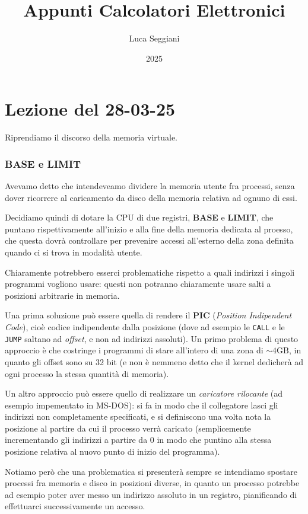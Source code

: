 \documentclass[a4paper,11pt]{article}
\title{Appunti Calcolatori Elettronici}
\author{Luca Seggiani}
\date{2025}
\begin{document}
\section{Lezione del 28-03-25}

\thispagestyle{empty}
\pagestyle{fancy}

Riprendiamo il discorso della memoria virtuale.

\subsubsection{BASE e LIMIT}
Avevamo detto che intendeveamo dividere la memoria utente fra processi, senza dover ricorrere al caricamento da disco della memoria relativa ad ognuno di essi.

Decidiamo quindi di dotare la CPU di due registri, \textbf{BASE} e \textbf{LIMIT}, che puntano rispettivamente all'inizio e alla fine della memoria dedicata al proesso, che questa dovrà controllare per prevenire accessi all'esterno della zona definita quando ci si trova in modalità utente.

Chiaramente potrebbero esserci problematiche rispetto a quali indirizzi i singoli programmi vogliono usare: questi non potranno chiaramente usare salti a posizioni arbitrarie in memoria.

Una prima soluzione può essere quella di rendere il \textbf{PIC} (\textit{Position Indipendent Code}), cioè codice indipendente dalla posizione (dove ad esempio le \lstinline|CALL| e le \lstinline|JUMP| saltano ad \textit{offset}, e non ad indirizzi assoluti).
Un primo problema di questo approccio è che costringe i programmi di stare all'intero di una zona di $\sim 4 \text{GB}$, in quanto gli offset sono su 32 bit (e non è nemmeno detto che il kernel dedicherà ad ogni processo la stessa quantità di memoria).

Un altro approccio può essere quello di realizzare un \textit{caricatore rilocante} (ad esempio impementato in MS-DOS): si fa in modo che il collegatore lasci gli indirizzi non completamente specificati, e si definiscono una volta nota la posizione al partire da cui il processo verrà caricato (semplicemente incrementando gli indirizzi a partire da 0 in modo che puntino alla stessa posizione relativa al nuovo punto di inizio del programma).

Notiamo però che una problematica si presenterà sempre se intendiamo spostare processi fra memoria e disco in posizioni diverse, in quanto un processo potrebbe ad esempio poter aver messo un indirizzo assoluto in un registro, pianificando di effettuarci successivamente un accesso.
\end{document}
